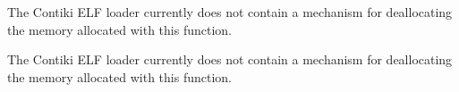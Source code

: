 
\begin{DoxyRefList}
\item[\label{bug__bug000001}%
\hypertarget{bug__bug000001}{}%
global\+Scope$>$ Member \hyperlink{group__elfloaderarch_ga1583b48c655f508d845d1a22bd54d2a3}{elfloader\+\_\+arch\+\_\+allocate\+\_\+ram} (int size)]The Contiki E\+L\+F loader currently does not contain a mechanism for deallocating the memory allocated with this function.  
\item[\label{bug__bug000002}%
\hypertarget{bug__bug000002}{}%
global\+Scope$>$ Member \hyperlink{group__elfloaderarch_gabf03ff0788cfecc08e82ec0fc3bff6f7}{elfloader\+\_\+arch\+\_\+allocate\+\_\+rom} (int size)]The Contiki E\+L\+F loader currently does not contain a mechanism for deallocating the memory allocated with this function. 
\end{DoxyRefList}